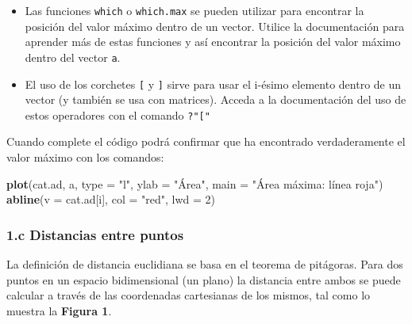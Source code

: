 \documentclass[]{article}
\newenvironment{Shaded}{}{}
\newcommand{\KeywordTok}[1]{\textcolor[rgb]{0.00,0.44,0.13}{\textbf{{#1}}}}
\newcommand{\DataTypeTok}[1]{\textcolor[rgb]{0.56,0.13,0.00}{{#1}}}
\newcommand{\DecValTok}[1]{\textcolor[rgb]{0.25,0.63,0.44}{{#1}}}
\newcommand{\StringTok}[1]{\textcolor[rgb]{0.25,0.44,0.63}{{#1}}}
\newcommand{\NormalTok}[1]{{#1}}
\begin{document}
\begin{itemize}
\item
  Las funciones \texttt{which} o \texttt{which.max} se pueden utilizar
  para encontrar la posición del valor máximo dentro de un vector.
  Utilice la documentación para aprender más de estas funciones y así
  encontrar la posición del valor máximo dentro del vector \texttt{a}.
\item
  El uso de los corchetes \texttt{{[}} y \texttt{{]}} sirve para usar el
  i-ésimo elemento dentro de un vector (y también se usa con matrices).
  Acceda a la documentación del uso de estos operadores con el comando
  \texttt{?"{[}"}
\end{itemize}
Cuando complete el código podrá confirmar que ha encontrado
verdaderamente el valor máximo con los comandos:

\begin{Shaded}
\begin{Highlighting}[]
\KeywordTok{plot}\NormalTok{(cat.ad, a, }\DataTypeTok{type =} \StringTok{"l"}\NormalTok{, }\DataTypeTok{ylab =} \StringTok{"Área"}\NormalTok{, }\DataTypeTok{main =} \StringTok{"Área máxima: línea roja"}\NormalTok{)}
\KeywordTok{abline}\NormalTok{(}\DataTypeTok{v =} \NormalTok{cat.ad[i], }\DataTypeTok{col =} \StringTok{"red"}\NormalTok{, }\DataTypeTok{lwd =} \DecValTok{2}\NormalTok{)}
\end{Highlighting}
\end{Shaded}
\subsubsection{1.c Distancias entre puntos}

La definición de distancia euclidiana se basa en el teorema de
pitágoras. Para dos puntos en un espacio bidimensional (un plano) la
distancia entre ambos se puede calcular a través de las coordenadas
cartesianas de los mismos, tal como lo muestra la \textbf{Figura 1}.
\end{document}
